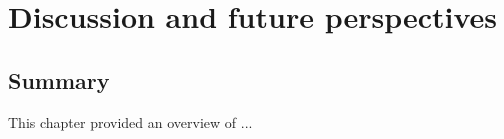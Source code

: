 \chapter{Discussion and future perspectives} 
\label{discussionperspectives}

\section*{Summary}
This chapter provided an overview of ...